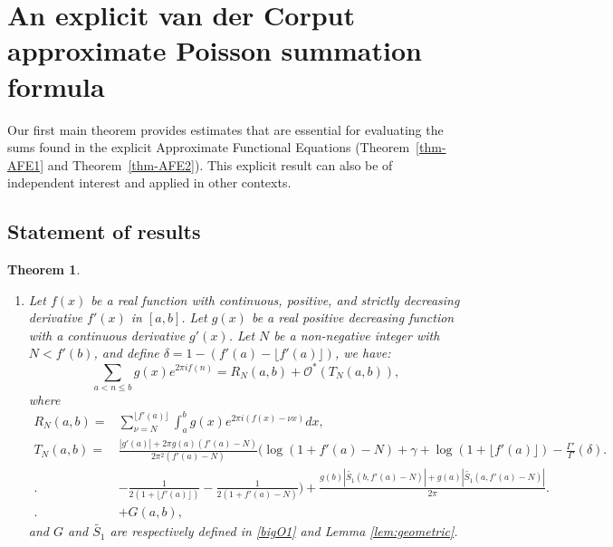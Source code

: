 \documentclass[11pt,letterpaper,oneside,reqno]{amsart}
\renewcommand{\^}[1]{\widehat{#1}}
\numberwithin{equation}{section}
\newtheorem{theorem}{Theorem}
\theoremstyle{remark}
\newcommand*{\thmref}[1]{Theorem~\ref{#1}}
\begin{document}
\section{An explicit van der Corput approximate Poisson summation formula}
\label{Section-Theorem-Bestimate}
Our first main theorem provides  estimates that are essential for evaluating the sums found in the explicit Approximate Functional Equations (\thmref{thm-AFE1} and \thmref{thm-AFE2}). 
This explicit result can also be of independent interest and applied in other contexts.
%
\subsection{Statement of results}
%
\begin{theorem} \label{thm-VDC}\ 
    \begin{enumerate}
    \item[{\bf Part I.}] Let $f(x)$ be a real function with continuous, positive, and strictly decreasing derivative  $f'(x)$ in $[a,b]$. Let $g(x)$ be a real positive decreasing function with a continuous derivative $g'(x)$. Let $N$ be a non-negative integer with $N< f'(b)$, and define $\delta = 1 - (f'(a)-\lfloor f'(a) \rfloor)$, we have:
    \begin{equation}
        \label{vanderCorputB}
        \sum_{a<n \leq b}g(x) e^{2\pi i f(n)} = 
    R_N(a,b) + \mathcal{O}^*\left(T_N(a,b)\right),
    \end{equation}
    where
\begin{align} 
\label{def-RNab}
R_N(a,b) =& \sum_{\nu =N}^{\lfloor f'(a) \rfloor} \int_{a}^{b} g(x)e^{2\pi i (f(x)-\nu x)} dx , 
\\
T_N(a,b) = & \frac{|g'(a)|+2\pi g(a) \left(f'(a)-N\right)}{2\pi^2 \left(f'(a)-N\right)} \bigg(\log(1+f'(a)-N)+\gamma +\log(1+\lfloor f'(a) \rfloor) - \frac{\Gamma'}{\Gamma}(\delta) 
\bigg. \nonumber
\\ \bigg.& -\frac1{2(1+\lfloor f'(a) \rfloor )}  -\frac{1}{2(1+f'(a)-N)}\bigg)  + \frac{g(b) |\tilde{S_1}(b,f'(a)-N)| + g(a) |\tilde{S_1}(a,f'(a)-N)|}{2\pi} \bigg. \nonumber
\\ \bigg.  &+ G(a,b) ,\label{def-TNab}
\end{align}
and $G$ and $\tilde{S_1}$ are respectively defined in \eqref{bigO1} and Lemma \ref{lem:geometric}.


\end{enumerate}
\end{theorem}
\end{document}
